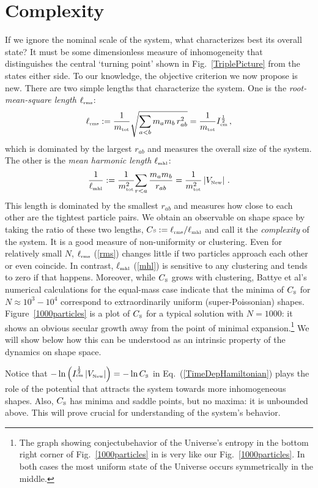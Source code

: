 \documentclass[prl,nofootinbib,twocolumn,superscriptaddress]{revtex4}
\newcommand{\st}[1]{\text{\tiny \rm #1}}
\def\e{\emph}
\def\bq{\begin{equation}}
\def\ee{\end{equation}}
\begin{document}
\section{Complexity}

If we ignore the  nominal scale of the system, what characterizes best its overall state?
It must be some dimensionless measure of inhomogeneity that distinguishes
the central `turning point' shown in Fig.~\ref{TriplePicture} from the states either side. To our knowledge, the objective criterion we now propose is new.
There are two simple lengths that characterize the system. 
One is the \e{root-mean-square length} $\ell_\st{rms}$:
\bq
\ell_\st{rms}:={1\over m_\st{tot}}\sqrt{\sum_{a<b}m_am_b\,r_{ab}^2} = {1\over m_\st{tot}} I_\st{cm}^{\frac 1 2} \,, \label{rms}
\ee
which is dominated by the largest 
$r_{ab}$ and measures the overall size of the system.  The other is the \e{mean harmonic length} $\ell_\st{mhl}$:
\bq
{1\over\ell_\st{mhl}}:={1\over m_\st{tot}^2}{\sum_{r<a}{m_am_b\over r_{ab}}}\label{mhl} =  {1\over m_\st{tot}^2} \left| V_\st{New} \right| \,.
\ee
This length is dominated by the smallest  $r_{ab}$ and measures how close
to each other are the tightest particle pairs. We obtain an observable on shape space
by taking the ratio of these two lengths, $C\st{S}:= \ell_\st{rms}/\ell_\st{mhl}$ and call it the \e{complexity} of the system. It is a good measure of non-uniformity or clustering. Even for relatively small $N$, $\ell_\st{rms}$ (\ref{rms}) changes little if two particles approach each other or even coincide. In contrast, $\ell_\st{mhl}$ (\ref{mhl})   is sensitive to any clustering and tends to zero if that happens. Moreover, while $C_\st{S}$ grows with clustering, Battye et al's  \cite{BattyeGibbons} numerical calculations for the equal-mass case indicate that the minima of $C_\st{S}$ for $N\approx 10^3-10^4$ correspond to extraordinarily uniform (super-Poissonian) shapes. 
Figure~\ref{1000particles} is a plot of $C_\st{S}$ for a typical solution
with $N=1000$: it shows an obvious secular growth away from the point of minimal
expansion.\footnote{The graph showing conjectubehavior of the Universe's entropy in the 
bottom right corner of Fig.~\ref{1000particles} in \cite{CarrollChen} is very like our 
Fig.~\ref{1000particles}. In both cases the most uniform state of the Universe occurs 
symmetrically in the middle.}
We will show below how this can be understood as an intrinsic property of the dynamics on shape space.

Notice that
$ - \ln \left( I_\st{cm}^{\frac 1 2} \,| V_\st{New} | \right) = - \ln C_\st{S} $ in Eq.~(\ref{TimeDepHamiltonian}) plays the role of the potential that attracts the system towards
more inhomogeneous shapes. Also, $C_\st{S}$ has minima and saddle points, but no maxima: it is unbounded
above. This will prove crucial for understanding of the system's behavior.
\end{document}
